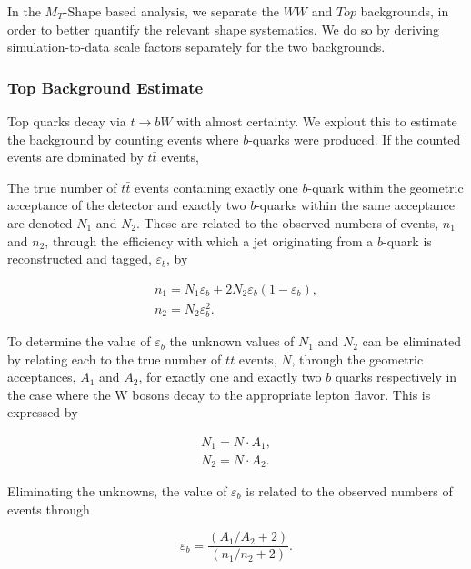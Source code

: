 
In the $M_T$-Shape based analysis, we separate the $WW$ and $Top$ backgrounds,
in order to better quantify the relevant shape systematics.
We do so by deriving simulation-to-data scale factors separately for the two backgrounds.

\subsubsection{Top Background Estimate}

Top quarks decay via $t\rightarrow bW$ with almost certainty.  
We explout this to estimate the background by counting events where $b$-quarks were produced. 
If the counted events are dominated by $t\bar{t}$ events, 

The true number of $t\bar{t}$ events containing exactly one $b$-quark within the geometric acceptance 
of the detector and exactly two $b$-quarks within the same acceptance are denoted $N_{1}$ and $N_{2}$.  
These are related to the observed numbers of events, $n_{1}$ and $n_{2}$, 
through the efficiency with which a jet originating from a $b$-quark 
is reconstructed and tagged, $\varepsilon_{b}$, by 

\begin{eqnarray}
n_{1} = N_{1}\varepsilon_{b} + 2N_{2}\varepsilon_{b}(1-\varepsilon_{b}) \label{eqn:analysis_bTagEff1_n1},\\
n_{2} = N_{2}\varepsilon_{b}^{2} \label{eqn:analysis_bTagEff1_n2}.
\end{eqnarray}

To determine the value of $\varepsilon_{b}$ the unknown values of $N_{1}$ and $N_{2}$ 
can be eliminated by relating each to the true number of $t\bar{t}$ events, $N$, 
through the geometric acceptances, $A_1$ and $A_2$, for exactly one and exactly two $b$ quarks 
respectively in the case where the W bosons decay to the appropriate lepton flavor. 
This is expressed by

\begin{eqnarray}
N_{1} = N\cdot A_{1}, \\
N_{2} = N\cdot A_{2}.
\end{eqnarray}

Eliminating the unknowns, the value of $\varepsilon_{b}$ is related to the observed numbers of events through 

\begin{equation}
\label{eqn:analysis_bTagEff}
\varepsilon_{b} = \frac{(A_{1}/A_{2} + 2)}{(n_{1}/n_{2}+ 2)}.
\end{equation}

